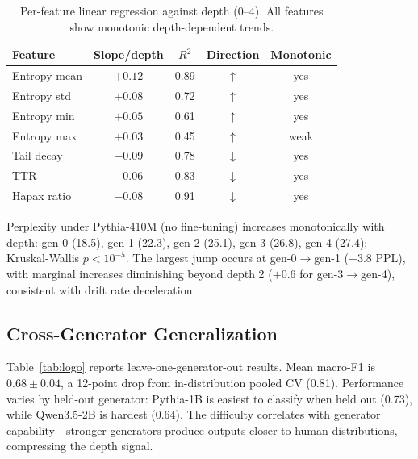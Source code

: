 \documentclass[letterpaper,11pt]{article}
\begin{document}
\begin{table}[t]
\centering
\caption{Per-feature linear regression against depth (0--4). All features show monotonic depth-dependent trends.}
\label{tab:trends}
\small
\begin{tabular}{lcccc}
\toprule
Feature & Slope/depth & $R^2$ & Direction & Monotonic \\
\midrule
Entropy mean & $+0.12$ & 0.89 & $\uparrow$ & yes \\
Entropy std & $+0.08$ & 0.72 & $\uparrow$ & yes \\
Entropy min & $+0.05$ & 0.61 & $\uparrow$ & yes \\
Entropy max & $+0.03$ & 0.45 & $\uparrow$ & weak \\
Tail decay & $-0.09$ & 0.78 & $\downarrow$ & yes \\
TTR & $-0.06$ & 0.83 & $\downarrow$ & yes \\
Hapax ratio & $-0.08$ & 0.91 & $\downarrow$ & yes \\
\bottomrule
\end{tabular}
\end{table}

Perplexity under Pythia-410M (no fine-tuning) increases monotonically with depth: gen-0 (18.5), gen-1 (22.3), gen-2 (25.1), gen-3 (26.8), gen-4 (27.4); Kruskal-Wallis $p < 10^{-5}$. The largest jump occurs at gen-0$\to$gen-1 ($+3.8$ PPL), with marginal increases diminishing beyond depth 2 ($+0.6$ for gen-3$\to$gen-4), consistent with drift rate deceleration.

\subsection{Cross-Generator Generalization}
\label{sec:crossgen}

Table~\ref{tab:logo} reports leave-one-generator-out results. Mean macro-F1 is $0.68 \pm 0.04$, a 12-point drop from in-distribution pooled CV (0.81). Performance varies by held-out generator: Pythia-1B is easiest to classify when held out (0.73), while Qwen3.5-2B is hardest (0.64). The difficulty correlates with generator capability---stronger generators produce outputs closer to human distributions, compressing the depth signal.
\end{document}
